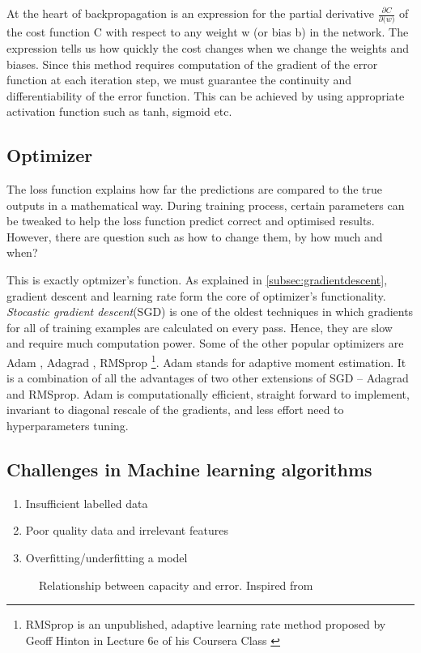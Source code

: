 At the heart of backpropagation is an expression for the partial derivative
$\frac{\partial C}{\partial \mathbf(w)}$ of the cost function C with respect to any weight w (or bias b) in the network. The expression tells us how quickly the cost changes when we change the weights and biases.
Since this method requires computation of the gradient of the error function at each
iteration step, we must guarantee the continuity and differentiability of the error
function. This can be achieved by using appropriate activation function such as tanh,
sigmoid etc.


\subsection{Optimizer}
\label{subsec:optimizer}
The loss function explains how far the predictions are compared to the true
outputs in a mathematical way. During training process, certain parameters can be tweaked
to help the loss function predict correct and optimised results. However, there are
question such as how to change them, by how much and when?

This is exactly optmizer's function. As explained in \ref{subsec:gradientdescent}, gradient
descent and learning rate form the core of optimizer's functionality. \textit{Stocastic
gradient descent}(SGD) is one of the oldest techniques in which gradients for all of
training examples are calculated on every pass. Hence, they are slow
and require much computation power. Some of the other popular optimizers are Adam
\cite{kingma2014adam}, Adagrad \cite{adagradpaper}, RMSprop \footnote{RMSprop is an unpublished, adaptive learning rate
method proposed by Geoff Hinton in Lecture 6e of his Coursera Class \cite{RMSProp}}. Adam stands for adaptive moment estimation.
It is a combination of all the advantages of two other extensions of SGD -- Adagrad and
RMSprop. Adam is computationally efficient, straight forward to implement, invariant to
diagonal rescale of the gradients, and less effort need to hyperparameters tuning.

\subsection{Challenges in Machine learning algorithms}
\begin{enumerate}
    \item Insufficient labelled data
    \item Poor quality data and irrelevant features
    \item Overfitting/underfitting a model
\end{enumerate}
\begin{figure}[!ht]
	\centering
    \def\svgwidth{0.7\textwidth}
    \caption{Relationship between capacity and error. Inspired from
    \cite{Goodfellow-et-al-2016}}
    \label{fig:overfittingunderfitting}
\end{figure}

